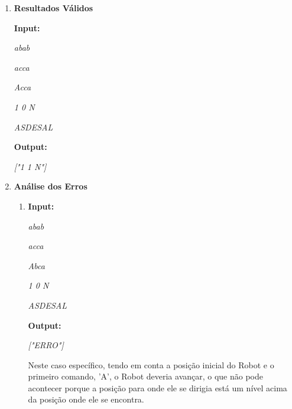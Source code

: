 \documentclass[a4paper, 12pt, portuguese]{article}
\begin{document}
\begin{enumerate}

\vspace{1 mm}

\item\textbf{Resultados Válidos}

\textbf{Input:}

\vspace{2 mm}

\textit{abab}

\textit{acca}

\textit{Acca}

\textit{1 0 N}

\textit{ASDESAL}

\vspace{2 mm}

\textbf{Output:}

\vspace{2 mm}

\textit{["1 1 N"]}

\vspace{2 mm}

\item\textbf{Análise dos Erros}
\begin{enumerate}

\item

\textbf{Input:}

\vspace{2 mm}

\textit{abab}

\textit{acca}

\textit{Abca}

\textit{1 0 N}

\textit{ASDESAL}

\vspace{2 mm}

\textbf{Output:}

\vspace{2 mm}

\textit{["ERRO"]}

\vspace{4 mm}

Neste caso específico, tendo em conta a posição inicial do Robot e o primeiro comando, 'A', o Robot deveria avançar, o que não pode acontecer porque a posição para onde ele se dirigia está um nível acima da posição onde ele se encontra.

\vspace{2 mm}


\end{enumerate}
\end{enumerate}
\end{document}
